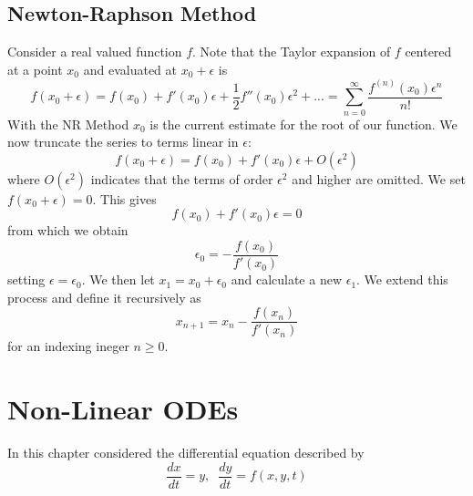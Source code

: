 \documentclass[12pt]{report}
\begin{document}
\section{Newton-Raphson Method}

\begin{proc}{}{}
        Consider a real valued function $f$. Note that the Taylor expansion of $f$ centered at a point $x_0$ and evaluated at $x_0 + \epsilon$ is \begin{equation}
                f(x_0+\epsilon) = f(x_0) + f'(x_0)\epsilon + \frac{1}{2}f''(x_0)\epsilon^2 + ... = \sum_{n=0}^{\infty}\frac{f^{(n)}(x_0)\epsilon^n}{n!}
        \end{equation}
        With the NR Method $x_0$ is the current estimate for the root of our function. We now truncate the series to terms linear in $\epsilon$: \begin{equation}
                f(x_0+\epsilon) = f(x_0) + f'(x_0)\epsilon + O(\epsilon^2)
        \end{equation}
        where $O(\epsilon^2)$ indicates that the terms of order $\epsilon^2$ and higher are omitted. We set $f(x_0+\epsilon) = 0$. This gives \begin{equation}
                f(x_0) + f'(x_0)\epsilon = 0
        \end{equation}
        from which we obtain \begin{equation}
                \epsilon_0 = -\frac{f(x_0)}{f'(x_0)}
        \end{equation}
        setting $\epsilon = \epsilon_0$. We then let $x_1 = x_0 + \epsilon_0$ and calculate a new $\epsilon_1$. We extend this process and define it recursively as \begin{equation}
                x_{n+1} = x_n - \frac{f(x_n)}{f'(x_n)}
        \end{equation}
        for an indexing ineger $n \geq 0$.
\end{proc}




\chapter{Non-Linear ODEs}

\begin{rmk}{}{}
        In this chapter considered the differential equation described by \begin{equation}
                \frac{dx}{dt} = y, \;\;\frac{dy}{dt} = f(x,y,t)
        \end{equation}
\end{rmk}
\end{document}
